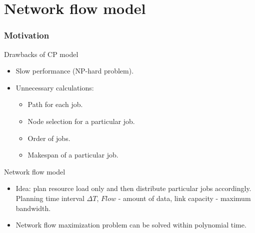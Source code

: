 \documentclass{beamer}
\begin{document}
\section{Network flow model}
\begin{frame}\frametitle{Motivation}
\begin{block}{Drawbacks of CP model}
\begin{itemize}
\item Slow performance (NP-hard problem).
\item Unnecessary calculations:
			\begin{itemize}
			\item Path for each job.
			\item Node selection for a particular job.
			\item Order  of jobs.
			\item Makespan of a particular job.
			\end{itemize}
\end{itemize}
\end{block}         

\begin{block}{Network flow model}
\begin{itemize}
\item Idea: plan resource load only and then distribute particular jobs accordingly. Planning time interval $\Delta T$, $Flow$ - amount of data, link capacity - maximum bandwidth.
\item Network flow maximization problem can be solved within polynomial time.
\end{itemize}
\end{block}    
\end{frame}
\end{document}
